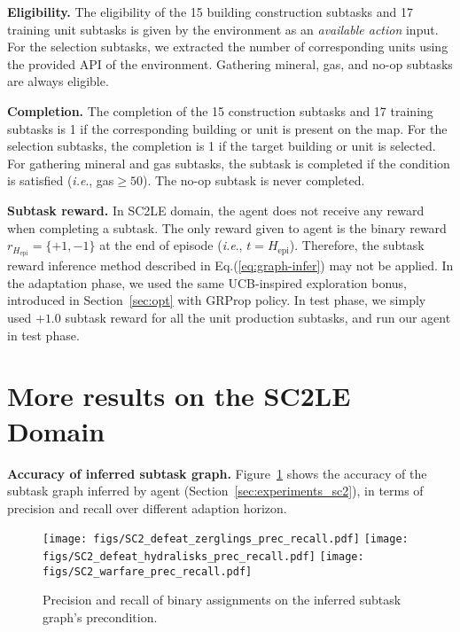 \documentclass{article} \usepackage{iclr2020_conference,times}
\makeatletter
\DeclareRobustCommand\onedot{\futurelet\@let@token\@onedot}
\def\onedot{.}
\def\ie{\emph{i.e}\onedot} \def\Ie{\emph{I.e}\onedot}
\makeatother
\begin{document}
\textbf{Eligibility.}
 The eligibility of the 15 building construction subtasks and 17 training unit subtasks is given by the environment as an \textit{available action} input. For the selection subtasks, we extracted the number of corresponding units using the provided API of the environment. Gathering mineral, gas, and no-op subtasks are always eligible.

\textbf{Completion.}
The completion of the 15 construction subtasks and 17 training subtasks is 1 if the corresponding building or unit is present on the map. For the selection subtasks, the completion is 1 if the target building or unit is selected. For gathering mineral and gas subtasks, the subtask is completed if the condition is satisfied (\ie, gas$\geq 50$). The no-op subtask is never completed.

\textbf{Subtask reward.}
In SC2LE domain, the agent does not receive any reward when completing a subtask. 
The only reward given to agent is the binary reward $r_{H_{\text{epi}}}=\{+1, -1\}$ at the end of episode (\ie, $t=H_{\text{epi}}$).
Therefore, the subtask reward inference method described in Eq.(\ref{eq:graph-infer}) may not be applied. In the adaptation phase, we used the same UCB-inspired exploration bonus, introduced in Section~\ref{sec:opt} with GRProp policy. In test phase, we simply used $+1.0$ subtask reward for all the unit production subtasks, and run our \NSGIGRProp agent in test phase.
\section{More results on the SC2LE Domain}
\label{sec:appendix_sc2result}

\textbf{Accuracy of inferred subtask graph.}
Figure~\ref{fig:sc2_result_recall} shows the accuracy of the subtask graph inferred by \NSGIGRProp agent (Section~\ref{sec:experiments_sc2}), 
in terms of precision and recall over different adaption horizon. 


\begin{figure}[!hbt]
    \centering
    \texttt{[image: figs/SC2\_defeat\_zerglings\_prec\_recall.pdf]}\quad
    \texttt{[image: figs/SC2\_defeat\_hydralisks\_prec\_recall.pdf]}\quad
    \texttt{[image: figs/SC2\_warfare\_prec\_recall.pdf]}\vspace*{-5pt}
    \caption{
        Precision and recall of binary assignments on the inferred subtask graph's precondition.
    }
    \label{fig:sc2_result_recall}
\end{figure}
\end{document}
